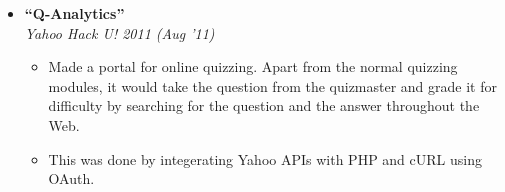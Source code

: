 \documentclass[margin,line]{resume}
\begin{document}
\begin{resume}
\begin{itemize}
  \item \large{\textbf{\textsf{``Q-Analytics''}}}
    \\ \small{\textit{Yahoo Hack U! 2011 (Aug '11)}}
    \normalsize
    \begin{itemize}
    \item Made a portal for online quizzing. Apart from the normal quizzing modules, it would take the question from the quizmaster and grade it for difficulty by searching for the question and the answer throughout the Web.
    \item This was done by integerating Yahoo APIs with PHP and cURL using OAuth.
    \end{itemize}
    
  \end{itemize}






\end{resume}
\end{document}
